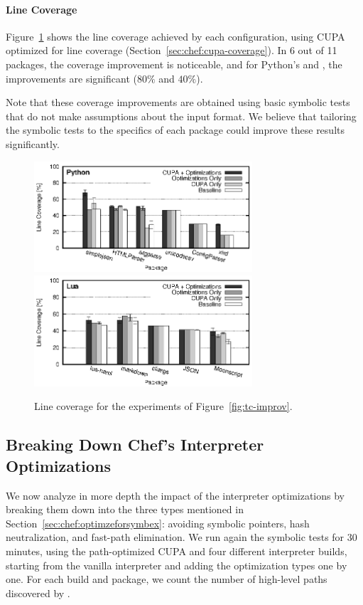 \paragraph{Line Coverage}

Figure~\ref{fig:coverage-improv} shows the line coverage achieved by each configuration, using CUPA optimized for line coverage (Section~\ref{sec:chef:cupa-coverage}).  In 6 out of 11 packages, the coverage improvement is noticeable, and for Python's  and , the improvements are significant ($80\%$ and $40\%$).

Note that these coverage improvements are obtained using basic symbolic tests that do not make assumptions about the input format.  We believe that tailoring the symbolic tests to the specifics of each package could improve these results significantly.

\begin{figure}[t]
  \centering
  \includegraphics[width=3.2in]{figures/evaluation/bkdown-stmtcov-python} \\
  \includegraphics[width=3.2in]{figures/evaluation/bkdown-stmtcov-lua}
  \caption{Line coverage for the experiments of Figure~\ref{fig:tc-improv}.}
  \label{fig:coverage-improv}
\end{figure}

\subsection{Breaking Down Chef's Interpreter Optimizations}
\label{sec:sub:optimizations}

We now analyze in more depth the impact of the interpreter optimizations by breaking them down into the three types mentioned in Section~\ref{sec:chef:optimzeforsymbex}: avoiding symbolic pointers, hash neutralization, and fast-path elimination.  We run again the symbolic tests for 30 minutes, using the path-optimized CUPA and four different interpreter builds, starting from the vanilla interpreter and adding the optimization types one by one.  For each build and package, we count the number of high-level paths discovered by \chef.

